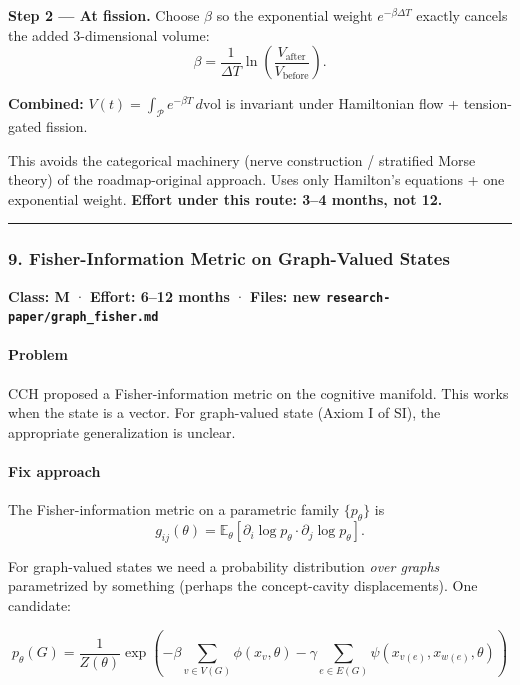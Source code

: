 \documentclass[
  11pt,
  a4paper,
]{article}
\begin{document}
\textbf{Step 2 --- At fission.} Choose \(\beta\) so the exponential
weight \(e^{-\beta \Delta T}\) exactly cancels the added 3-dimensional
volume: \[
\beta = \frac{1}{\Delta T} \ln\!\left(\frac{V_\text{after}}{V_\text{before}}\right).
\]

\textbf{Combined:}
\(V(t) = \int_{\mathcal{P}} e^{-\beta T} \, d\text{vol}\) is invariant
under Hamiltonian flow + tension-gated fission.

This avoids the categorical machinery (nerve construction / stratified
Morse theory) of the roadmap-original approach. Uses only Hamilton's
equations + one exponential weight. \textbf{Effort under this route:
3--4 months, not 12.}

\begin{center}\rule{0.5\linewidth}{0.5pt}\end{center}

\subsubsection{9. Fisher-Information Metric on Graph-Valued
States}\label{fisher-information-metric-on-graph-valued-states-1}

\textbf{Class: M} · \textbf{Effort: 6--12 months} · \textbf{Files: new
\texttt{research-paper/graph\_fisher.md}}

\paragraph{Problem}\label{problem-8}

CCH proposed a Fisher-information metric on the cognitive manifold. This
works when the state is a vector. For graph-valued state (Axiom I of
SI), the appropriate generalization is unclear.

\paragraph{Fix approach}\label{fix-approach-1}

The Fisher-information metric on a parametric family \(\{p_\theta\}\) is
\[
g_{ij}(\theta) = \mathbb{E}_\theta\left[\partial_i \log p_\theta \cdot \partial_j \log p_\theta\right].
\]

For graph-valued states we need a probability distribution \emph{over
graphs} parametrized by something (perhaps the concept-cavity
displacements). One candidate:

\[
p_\theta(G) = \frac{1}{Z(\theta)} \exp\left(-\beta \sum_{v \in V(G)} \phi(x_v, \theta) - \gamma \sum_{e \in E(G)} \psi(x_{v(e)}, x_{w(e)}, \theta)\right)
\]
\end{document}
